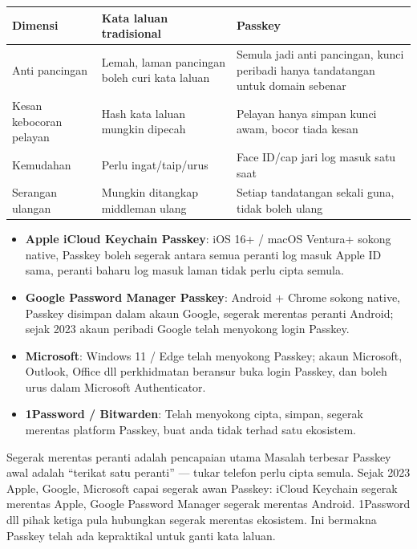 \begin{center}
\begin{tabularx}{\linewidth}{|X|X|X|}
\hline
\textbf{Dimensi} & \textbf{Kata laluan tradisional} & \textbf{Passkey} \tabularnewline
\hline
Anti pancingan & Lemah, laman pancingan boleh curi kata laluan & Semula jadi anti pancingan, kunci peribadi hanya tandatangan untuk domain sebenar \tabularnewline
Kesan kebocoran pelayan & Hash kata laluan mungkin dipecah & Pelayan hanya simpan kunci awam, bocor tiada kesan \tabularnewline
Kemudahan & Perlu ingat/taip/urus & Face ID/cap jari log masuk satu saat \tabularnewline
Serangan ulangan & Mungkin ditangkap middleman ulang & Setiap tandatangan sekali guna, tidak boleh ulang \tabularnewline
\hline
\end{tabularx}
\end{center}


\begin{itemize}
  \item \textbf{Apple iCloud Keychain Passkey}: iOS 16+ / macOS Ventura+ sokong native, Passkey boleh segerak antara semua peranti log masuk Apple ID sama, peranti baharu log masuk laman tidak perlu cipta semula.
  \item \textbf{Google Password Manager Passkey}: Android + Chrome sokong native, Passkey disimpan dalam akaun Google, segerak merentas peranti Android; sejak 2023 akaun peribadi Google telah menyokong login Passkey.
  \item \textbf{Microsoft}: Windows 11 / Edge telah menyokong Passkey; akaun Microsoft, Outlook, Office dll perkhidmatan beransur buka login Passkey, dan boleh urus dalam Microsoft Authenticator.
  \item \textbf{1Password / Bitwarden}: Telah menyokong cipta, simpan, segerak merentas platform Passkey, buat anda tidak terhad satu ekosistem.
\end{itemize}

\begin{tcbinfo}{Segerak merentas peranti adalah pencapaian utama}
Masalah terbesar Passkey awal adalah “terikat satu peranti” — tukar telefon perlu cipta semula. Sejak 2023 Apple, Google, Microsoft capai segerak awan Passkey: iCloud Keychain segerak merentas Apple, Google Password Manager segerak merentas Android. 1Password dll pihak ketiga pula hubungkan segerak merentas ekosistem. Ini bermakna Passkey telah ada kepraktikal untuk ganti kata laluan.

\end{tcbinfo}

